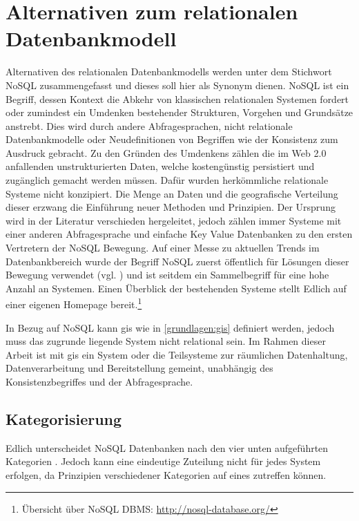 \section{Alternativen zum relationalen Datenbankmodell}
\label{nosql}
Alternativen des relationalen Datenbankmodells werden unter dem Stichwort NoSQL zusammengefasst und dieses soll hier als Synonym dienen.
NoSQL ist ein Begriff, dessen Kontext die Abkehr von klassischen relationalen Systemen fordert oder zumindest ein Umdenken bestehender Strukturen, Vorgehen und Grundsätze anstrebt.
Dies wird durch andere Abfragesprachen, nicht relationale Datenbankmodelle oder Neudefinitionen von Begriffen wie der Konsistenz zum Ausdruck gebracht.
Zu den Gründen des Umdenkens zählen die im Web 2.0 anfallenden unstrukturierten Daten, welche kostengünstig persistiert und zugänglich gemacht werden müssen.
Dafür wurden herkömmliche relationale Systeme nicht konzipiert.
Die Menge an Daten und die geografische Verteilung dieser erzwang die Einführung neuer Methoden und Prinzipien.
Der Ursprung wird in der Literatur verschieden hergeleitet, jedoch zählen immer Systeme mit einer anderen Abfragesprache und einfache Key Value Datenbanken zu den ersten Vertretern der NoSQL Bewegung.
Auf einer Messe zu aktuellen Trends im Datenbankbereich wurde der Begriff NoSQL zuerst öffentlich für Lösungen dieser Bewegung verwendet (vgl. \cite{website:originnosql}) und ist seitdem ein Sammelbegriff für eine hohe Anzahl an Systemen.
Einen Überblick der bestehenden Systeme stellt Edlich auf einer eigenen Homepage bereit.\footnote{Übersicht über NoSQL DBMS: \url{http://nosql-database.org/}}

In Bezug auf NoSQL kann \Gls{gis} wie in \ref{grundlagen:gis} definiert werden, jedoch muss das zugrunde liegende System nicht relational sein.
Im Rahmen dieser Arbeit ist mit \Gls{gis} ein System oder die Teilsysteme zur räumlichen Datenhaltung, Datenverarbeitung und Bereitstellung gemeint, unabhängig des Konsistenzbegriffes und der Abfragesprache.

\subsection{Kategorisierung}
Edlich unterscheidet NoSQL Datenbanken nach den vier unten aufgeführten Kategorien \cite{book:nosql-einfuehrung}.
Jedoch kann eine eindeutige Zuteilung nicht für jedes System erfolgen, da Prinzipien verschiedener Kategorien auf eines zutreffen können.



